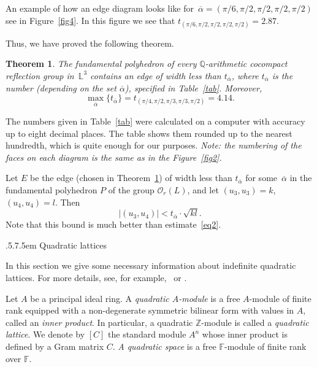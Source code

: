 \documentclass[reqno,12pt]{amsart}
\makeatletter
\def\section{\@startsection{section}{2}%
    {\z@}{.5\linespacing\@plus.7\linespacing}{.5em}%
    {\normalfont\bfseries\centering}}
\newcounter{z}
\newtheorem{theorem}{\indent Theorem}%
\makeatother
\begin{document}
An example of how an edge diagram looks like for~$\overline \alpha=(\pi/6, \pi/2,
\pi/2, \pi/2, \pi/2)$ see in Figure~\ref{fig4}. In this figure we see that
$t_{(\pi/6, \pi/2, \pi/2, \pi/2, \pi/2)}=2.87$.


Thus, we have proved the following theorem.

\begin{theorem}
\label{t2.3}
The fundamental polyhedron of every $\mathbb{Q}$-arithmetic cocompact
 reflection group in~$\mathbb{L}^3$ contains an edge of width less than $t_{\overline
\alpha}$, where $t_{\overline \alpha}$ is the number (depending on the set $\overline
\alpha$), specified in Table~\ref{tab}. Moreover,
$$
\max_{\overline \alpha} \{t_{\overline \alpha}\}=t_{(\pi/4, \pi/2, \pi/3,
\pi/3, \pi/2)}= 4.14.
$$
\end{theorem}

The numbers given in Table~\ref{tab} were calculated on a computer with accuracy
up to eight decimal places. The table shows them rounded up to the nearest hundredth, which is 
quite enough for our purposes. \textit{Note: the numbering of the faces on each diagram is
the same as in the Figure~\ref{fig2}.}

Let $E$ be the edge (chosen in Theorem~\ref{t2.3}) of width less than  $t_{\overline
\alpha}$ for some~$\overline \alpha$ in the fundamental polyhedron $P$ of the group
 $\mathcal{O}_r (L)$, and let $(u_3, u_3)=k$, $(u_4, u_4)=l$. Then
\begin{equation}
\label{eq6}
|(u_3, u_4)| < t_{\overline \alpha} \cdot \sqrt{kl}.
\end{equation}
Note that this bound is much better than estimate~\eqref{eq2}.


\section{Quadratic lattices}
\label{s3}

In this section we give some necessary information about
indefinite quadratic lattices. For more details, see, for example,~\cite{Kas78} or \cite{Vin84}.


Let $A$ be a principal ideal ring. A \textit{quadratic $A$-module} is a
free $A$-module of finite rank equipped with a non-degenerate
 symmetric bilinear form
with values in $A$, called an \textit{inner product}. In particular,
a quadratic $\mathbb{Z}$-module is called
a \textit{quadratic lattice}.
We denote by $[C]$ the standard module $A^n$ whose
inner product is defined by a Gram matrix $C$.
\textit{A quadratic space} is a free $\mathbb{F}$-module of finite rank over $\mathbb{F}$.
\end{document}
